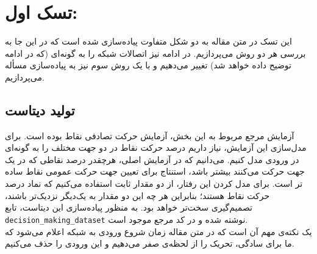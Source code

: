\documentclass[a4paper]{article}
\begin{document}
 \section{تسک اول: 
 }
این تسک در متن مقاله به دو شکل متفاوت پیاده‌سازی شده است که در این جا به بررسی هر دو روش می‌پردازیم. در ادامه نیز اتصالات شبکه را به گونه‌ای (که در ادامه توضیح داده خواهد شد) تغییر می‌دهیم و با یک روش سوم نیز به پیاده‌سازی مسأله می‌پردازیم.

\subsection{تولید دیتاست}
آزمایش مرجع مربوط به این بخش، آزمایش حرکت تصادفی نقاط بوده است. برای مدل‌سازی این آزمایش، نیاز داریم درصد حرکت نقاط در دو جهت مختلف را به گونه‌ای در ورودی مدل کنیم. می‌دانیم که در آزمایش اصلی، هرچقدر درصد نقاطی که در یک جهت حرکت می‌کنند بیشتر باشد، استنتاج برای تعیین جهت حرکت عمومی نقاط ساده تر است. برای مدل کردن این رفتار، از دو مقدار ثابت استفاده می‌کنیم که نماد درصد حرکت نقاط هستند؛ بنابراین هر چه این دو مقدار به یک‌دیگر نزدیک‌تر باشند، تصمیم‌گیری سخت‌تر خواهد بود. به منظور پیاده‌سازی این دیتاست، تابع \texttt{decision\_making\_dataset} نوشته شده و در کد مرجع موجود است.\\
یک نکته‌ی مهم آن است که در متن مقاله زمان شروع ورودی به شبکه اعلام می‌شود که ما برای سادگی، تحریک را از لحظه‌ی صفر می‌دهیم و این ورودی را حذف می‌کنیم.
\end{document}
